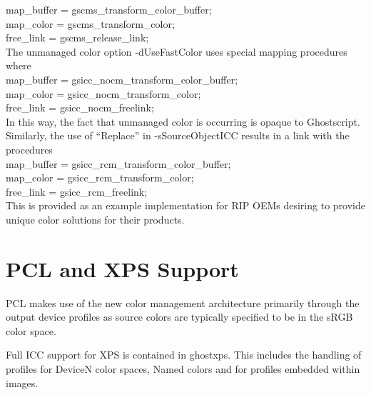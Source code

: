 \documentclass[12pt,notitlepage]{article}
\begin{document}
\noindent map\_buffer = gscms\_transform\_color\_buffer;\\
map\_color = gscms\_transform\_color;\\
free\_link = gscms\_release\_link;\\

The unmanaged color option -dUseFastColor uses special mapping procedures where\\

\noindent map\_buffer = gsicc\_nocm\_transform\_color\_buffer;\\
map\_color = gsicc\_nocm\_transform\_color;\\
free\_link = gsicc\_nocm\_freelink;\\

In this way, the fact that unmanaged color is occurring is opaque to Ghostscript.   Similarly, the use of ``Replace'' in -sSourceObjectICC results in a link with the procedures\\

\noindent map\_buffer = gsicc\_rcm\_transform\_color\_buffer;\\
map\_color = gsicc\_rcm\_transform\_color;\\
free\_link = gsicc\_rcm\_freelink;\\

This is provided as an example implementation for RIP OEMs desiring to provide unique color solutions for their products.

\section{PCL and XPS Support}

PCL\cite{PCL} makes use of the new color management architecture primarily through the output device profiles as source colors are typically specified to be in the sRGB color space.

Full ICC support for XPS\cite{XPS} is contained in ghostxps. This includes the handling of profiles for DeviceN color spaces, Named colors and for profiles embedded within images.
\end{document}
